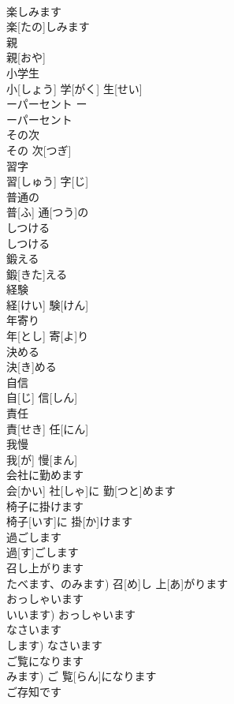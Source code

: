 \documentclass[8pt]{extreport}
\begin{document}
\begin{CJK}{UTF8}{min}
\\	楽しみます	
\\	楽[たの]しみます		
\\	親	
\\	親[おや]		
\\	小学生	
\\	小[しょう] 学[がく] 生[せい]		
\\	ーパーセント	ー 
\\	ーパーセント		
\\	その次	
\\	その 次[つぎ]		
\\	習字	
\\	習[しゅう] 字[じ]		
\\	普通の	
\\	普[ふ] 通[つう]の		
\\	しつける	
\\	しつける		
\\	鍛える	
\\	鍛[きた]える		
\\	経験	
\\	経[けい] 験[けん]		
\\	年寄り	
\\	年[とし] 寄[よ]り		
\\	決める	
\\	決[き]める		
\\	自信	
\\	自[じ] 信[しん]		
\\	責任	
\\	責[せき] 任[にん]		
\\	我慢	
\\	我[が] 慢[まん]		
\\	会社に勤めます	
\\	会[かい] 社[しゃ]に 勤[つと]めます		
\\	椅子に掛けます	
\\	椅子[いす]に 掛[か]けます		
\\	過ごします	
\\	過[す]ごします		
\\	召し上がります	
\\	たべます、のみます)	召[め]し 上[あ]がります		
\\	おっしゃいます	
\\	いいます)	おっしゃいます		
\\	なさいます	
\\	します)	なさいます		
\\	ご覧になります	
\\	みます)	ご 覧[らん]になります		
\\	ご存知です	

\end{CJK}
\end{document}
